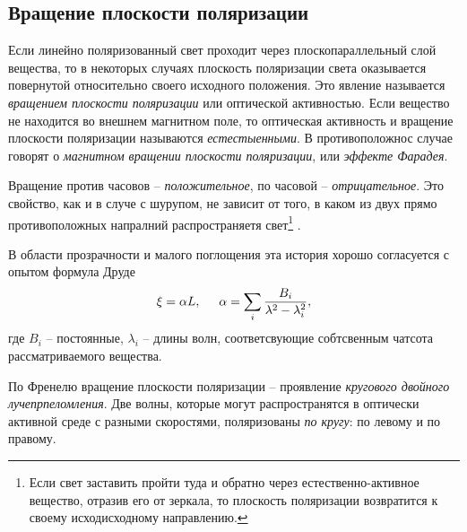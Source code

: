 \subsection{Вращение плоскости поляризации}


Если линейно поляризованный свет проходит через плоскопараллельный слой вещества, то в некоторых случаях плоскость поляризации света оказывается повернутой относительно своего исходного положения. Это явление называется \textit{вращением плоскости поляризации} или оптической активностью. Если вещество не находится во внешнем магнитном поле, то оптическая активность и вращение плоскости поляризации называются \textit{естестыенными}. В противоположнос случае говорят о \textit{магнитном вращении плоскости поляризации}, или \textit{эффекте Фарадея}. 


Вращение против часовов -- \textit{положительное}, по часовой -- \textit{отрицательное}. Это свойство, как и в случе с шурупом, не зависит от того, в каком из двух прямо противоположных напралний распространяетя свет\footnote{
    Если свет заставить пройти туда и обратно через естественно-активное вещество, отразив его от
    зеркала, то плоскость поляризации возвратится к своему исходисходному направлению.
} . 


В области прозрачности и малого поглощения эта история хорошо согласуется с опытом формула Друде
\begin{equation*}
    \xi = \alpha L,
    \hspace{5 mm} 
    \alpha = \sum_i \frac{B_i}{\lambda^2-\lambda_i^2},
\end{equation*}
где $B_i$ -- постоянные, $\lambda_i$ -- длины волн, соответсвующие собтсвенным чатсота рассматриваемого вещества. 



По Френелю вращение плоскости поляризации -- проявление \textit{кругового двойного лучепрпеломления}. Две волны, которые могут распространятся в оптически активной среде с разными скоростями, поляризованы \textit{по кругу}: по левому и по правому.

